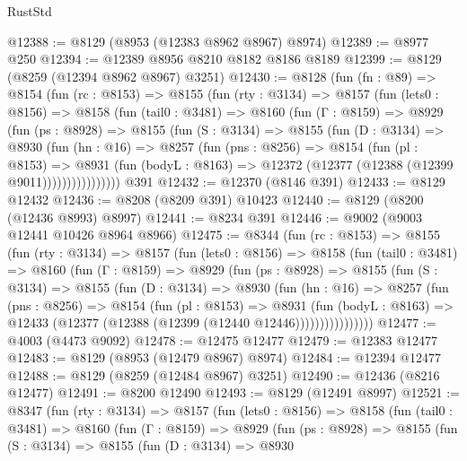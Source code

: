\begin{lexlean}{RustStd}
\begin{coremodule}
@12388 := @8129 (@8953 (@12383 @8962 @8967) @8974)
@12389 := @8977 @250
@12394 := @12389 @8956 @8210 @8182 @8186 @8189
@12399 := @8129 (@8259 (@12394 @8962 @8967) @3251)
@12430 := @8128
    (fun (fn : @89) =>
    @8154
      (fun (rc : @8153) =>
      @8155
        (fun (rty : @3134) =>
        @8157
          (fun (lets0 : @8156) =>
          @8158
            (fun (tail0 : @3481) =>
            @8160
              (fun (Γ : @8159) =>
              @8929
                (fun (ps : @8928) =>
                @8155
                  (fun (S : @3134) =>
                  @8155
                    (fun (D : @3134) =>
                    @8930
                      (fun (hn : @16) =>
                      @8257
                        (fun (pns : @8256) =>
                        @8154
                          (fun (pl : @8153) =>
                          @8931
                            (fun (bodyL : @8163) =>
                            @12372 (@12377 (@12388 (@12399 @9011))))))))))))))))
    @391
@12432 := @12370 (@8146 @391)
@12433 := @8129 @12432
@12436 := @8208 (@8209 @391) @10423
@12440 := @8129 (@8200 (@12436 @8993) @8997)
@12441 := @8234 @391
@12446 := @9002 (@9003 @12441 @10426 @8964 @8966)
@12475 := @8344
    (fun (rc : @8153) =>
    @8155
      (fun (rty : @3134) =>
      @8157
        (fun (lets0 : @8156) =>
        @8158
          (fun (tail0 : @3481) =>
          @8160
            (fun (Γ : @8159) =>
            @8929
              (fun (ps : @8928) =>
              @8155
                (fun (S : @3134) =>
                @8155
                  (fun (D : @3134) =>
                  @8930
                    (fun (hn : @16) =>
                    @8257
                      (fun (pns : @8256) =>
                      @8154
                        (fun (pl : @8153) =>
                        @8931
                          (fun (bodyL : @8163) =>
                          @12433 (@12377 (@12388 (@12399 (@12440 @12446))))))))))))))))
@12477 := @4003 (@4473 @9092)
@12478 := @12475 @12477
@12479 := @12383 @12477
@12483 := @8129 (@8953 (@12479 @8967) @8974)
@12484 := @12394 @12477
@12488 := @8129 (@8259 (@12484 @8967) @3251)
@12490 := @12436 (@8216 @12477)
@12491 := @8200 @12490
@12493 := @8129 (@12491 @8997)
@12521 := @8347
    (fun (rty : @3134) =>
    @8157
      (fun (lets0 : @8156) =>
      @8158
        (fun (tail0 : @3481) =>
        @8160
          (fun (Γ : @8159) =>
          @8929
            (fun (ps : @8928) =>
            @8155
              (fun (S : @3134) =>
              @8155
                (fun (D : @3134) =>
                @8930

\end{coremodule}
\end{lexlean}
